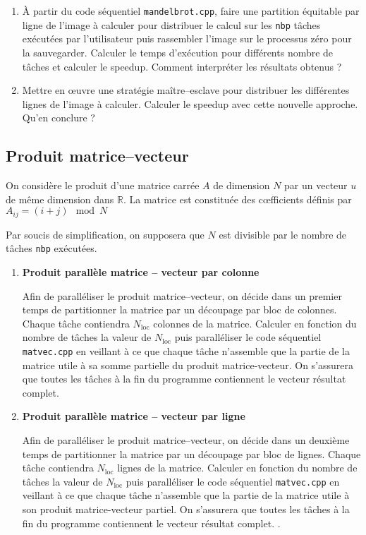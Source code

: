\documentclass[11pt,a4paper]{article}
\begin{document}
\begin{enumerate}
\item À partir du code séquentiel \texttt{mandelbrot.cpp}, faire une partition équitable par ligne de l'image à calculer pour distribuer le calcul sur les \texttt{nbp} tâches exécutées par l'utilisateur puis rassembler l'image sur le processus zéro pour la sauvegarder. Calculer le temps d'exécution pour différents nombre de tâches et calculer le speedup. Comment interpréter les résultats obtenus ?
\item Mettre en {\oe}uvre une stratégie maître--esclave pour distribuer les différentes lignes de l'image à calculer. Calculer le speedup avec cette nouvelle approche. Qu'en conclure ?
\end{enumerate}

\subsection{Produit matrice--vecteur}

On considère le produit d'une matrice carrée $A$  de dimension $N$ par un vecteur $u$ de même dimension dans $\mathbb{R}$. La matrice est constituée des c{\oe}fficients définis par $A_{ij} = (i+j) \mod N$

Par soucis de simplification, on supposera que $N$ est divisible par le nombre de tâches \texttt{nbp} exécutées.

\begin{enumerate}
\item \textbf{Produit parallèle  matrice -- vecteur par colonne}

Afin de paralléliser le produit matrice--vecteur, on décide dans un premier temps de partitionner la matrice par un découpage par bloc de colonnes. Chaque tâche contiendra $N_{\mbox{loc}}$ colonnes de la matrice. Calculer en fonction du nombre de tâches la valeur de $N_{\mbox{loc}}$ puis paralléliser le code séquentiel \texttt{matvec.cpp} en veillant à ce que chaque tâche n'assemble que la partie de la matrice utile à sa somme partielle du produit matrice-vecteur. On s'assurera que toutes les tâches à la fin du programme contiennent le vecteur résultat complet.

\item \textbf{Produit parallèle  matrice -- vecteur par ligne}

Afin de paralléliser le produit matrice--vecteur, on décide dans un deuxième temps de partitionner la matrice par un découpage par bloc de lignes. Chaque tâche contiendra $N_{\mbox{loc}}$ lignes de la matrice. Calculer en fonction du nombre de tâches la valeur de $N_{\mbox{loc}}$ puis paralléliser le code séquentiel \texttt{matvec.cpp} en veillant à ce que chaque tâche n'assemble que la partie de la matrice utile à son produit matrice-vecteur partiel. On s'assurera que toutes les tâches à la fin du programme contiennent le vecteur résultat complet.
.
\end{enumerate}
\end{document}
